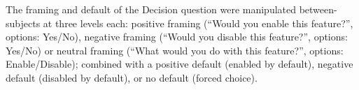 The framing and default of the Decision question were manipulated between-subjects at three levels each: positive framing (``Would you enable this feature?'', options: Yes/No), negative framing (``Would you disable this feature?'', options: Yes/No) or neutral framing (``What would you do with this feature?'', options: Enable/Disable); combined with a positive default (enabled by default), negative default (disabled by default), or no default (forced choice).


